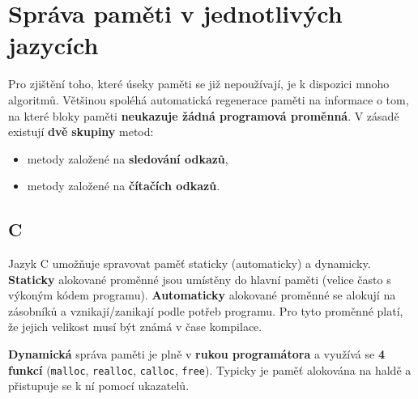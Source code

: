 \section{Správa paměti v jednotlivých jazycích}
Pro zjištění toho, které úseky paměti se již nepoužívají, je k dispozici mnoho algoritmů. Většinou spoléhá automatická regenerace paměti na informace o tom, na které bloky paměti \textbf{neukazuje žádná programová proměnná}. V zásadě existují \textbf{dvě} \textbf{skupiny} metod:
\begin{itemize}
    \item metody založené na \textbf{sledování odkazů},
    \item metody založené na \textbf{čítačích odkazů}.
\end{itemize}

\subsection{C}
Jazyk C umožňuje spravovat paměť staticky (automaticky) a dynamicky. \textbf{Staticky} alokované proměnné jsou umístěny do hlavní paměti (velice často s výkoným kódem programu). \textbf{Automaticky} alokované proměnné se alokují na zásobníků a vznikají/zanikají podle potřeb programu. Pro tyto proměnné platí, že jejich velikost musí být známá v čase kompilace.

\textbf{Dynamická} správa paměti je plně v \textbf{rukou programátora} a využívá se \textbf{4 funkcí} (\texttt{malloc}, \texttt{realloc}, \texttt{calloc}, \texttt{free}). Typicky je paměť alokována na haldě a přistupuje se k ní pomocí ukazatelů.


